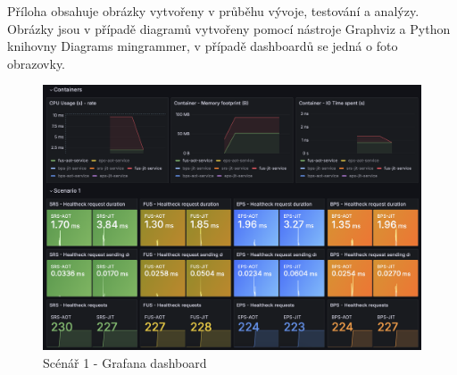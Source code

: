 
\listofappendices


Příloha obsahuje obrázky vytvořeny v průběhu vývoje, testování a analýzy. Obrázky jsou v případě diagramů vytvořeny pomocí nástroje Graphviz a Python knihovny Diagrams mingrammer, v případě dashboardů se jedná o foto obrazovky. \\

\begin{figure}
    \centering
    \includegraphics[width=1\textwidth]{graphics/images/scenario1-dashboard.png}
    \caption{Scénář 1 - Grafana dashboard}
    \label{fig:scenario1dashboard}
\end{figure}

